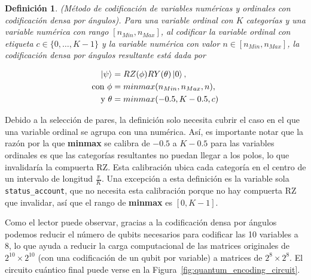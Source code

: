\documentclass{ieeeaccess}
\newtheorem{definition}{Definición}[section]
\begin{document}
\begin{definition}
  (Método de codificación de variables numéricas y ordinales con codificación densa por ángulos). Para una variable ordinal con $K$ categorías y una variable numérica con rango $[n_{Min}, n_{Max}]$, al codificar la variable ordinal con etiqueta $c \in \{0, \dots, K-1\}$ y la variable numérica con valor $n \in [n_{Min}, n_{Max}]$, la codificación densa por ángulos resultante está dada por

  \begin{align*}
    \ket{\psi} &= RZ(\phi)RY(\theta)\ket{0},\\
    \text{con } \phi &= minmax(n_{Min}, n_{Max}, n),\\
    \text{y } \theta &= minmax(-0.5, K - 0.5, c)
  \end{align*}
  \label{def:encoding_dense_angle}
\end{definition}

Debido a la selección de pares, la definición solo necesita cubrir el caso en el que una variable ordinal se agrupa con una numérica. Así, es importante notar que la razón por la que \textbf{minmax} se calibra de $-0.5$ a $K-0.5$ para las variables ordinales es que las categorías resultantes no puedan llegar a los polos, lo que invalidaría la compuerta RZ. Esta calibración ubica cada categoría en el centro de un intervalo de longitud $\frac{\pi}{K}$. Una excepción a esta definición es la variable sola \texttt{status\_account}, que no necesita esta calibración porque no hay compuerta RZ que invalidar, así que el rango de \textbf{minmax} es $[0, K-1]$.

Como el lector puede observar, gracias a la codificación densa por ángulos podemos reducir el número de qubits necesarios para codificar las 10 variables a 8, lo que ayuda a reducir la carga computacional de las matrices originales de $2^{10}\times 2^{10}$ (con una codificación de un qubit por variable) a matrices de $2^{8}\times 2^{8}$. El circuito cuántico final puede verse en la Figura~\ref{fig:quantum_encoding_circuit}.
\end{document}
